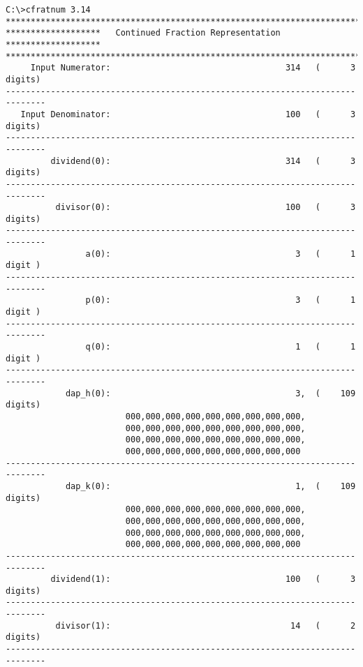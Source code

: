 \begin{dosutilcommandsampleinvocations}
\begin{scriptsize}
\begin{verbatim}
C:\>cfratnum 3.14
******************************************************************************
*******************   Continued Fraction Representation    *******************
******************************************************************************
     Input Numerator:                                   314   (      3 digits)
------------------------------------------------------------------------------
   Input Denominator:                                   100   (      3 digits)
------------------------------------------------------------------------------
         dividend(0):                                   314   (      3 digits)
------------------------------------------------------------------------------
          divisor(0):                                   100   (      3 digits)
------------------------------------------------------------------------------
                a(0):                                     3   (      1 digit )
------------------------------------------------------------------------------
                p(0):                                     3   (      1 digit )
------------------------------------------------------------------------------
                q(0):                                     1   (      1 digit )
------------------------------------------------------------------------------
            dap_h(0):                                     3,  (    109 digits)
                        000,000,000,000,000,000,000,000,000,
                        000,000,000,000,000,000,000,000,000,
                        000,000,000,000,000,000,000,000,000,
                        000,000,000,000,000,000,000,000,000
------------------------------------------------------------------------------
            dap_k(0):                                     1,  (    109 digits)
                        000,000,000,000,000,000,000,000,000,
                        000,000,000,000,000,000,000,000,000,
                        000,000,000,000,000,000,000,000,000,
                        000,000,000,000,000,000,000,000,000
------------------------------------------------------------------------------
         dividend(1):                                   100   (      3 digits)
------------------------------------------------------------------------------
          divisor(1):                                    14   (      2 digits)
------------------------------------------------------------------------------

\end{verbatim}
\end{scriptsize}
\end{dosutilcommandsampleinvocations}
